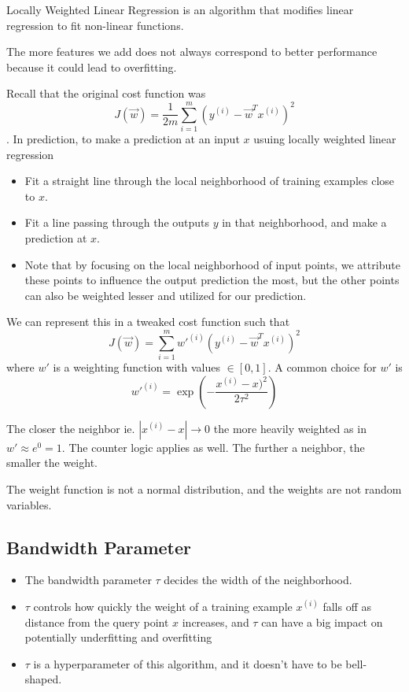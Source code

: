 \documentclass[12pt]{scrartcl}
\begin{document}
Locally Weighted Linear Regression is an algorithm that modifies linear regression to fit non-linear functions.

\begin{note}
    The more features we add does not always correspond to better performance because it could lead to overfitting.
\end{note}

Recall that the original cost function was
\[J(\vec{w}) = \frac{1}{2m}\sum_{i = 1}^m (y^{(i)} - \vec{w}^T x^{(i)})^2\]. In prediction, to make a prediction at an input $x$ usuing locally weighted linear regression
\begin{itemize}
    \item Fit a straight line through the local neighborhood of training examples close to $x$.
    \item Fit a line passing through the outputs $y$ in that neighborhood, and make a prediction at $x$.
    \item Note that by focusing on the local neighborhood of input points, we attribute these points to influence the output prediction the most, but the other points can also be weighted lesser and utilized for our prediction.
\end{itemize}
We can represent this in a tweaked cost function such that 
\[J(\vec{w}) = \sum_{i=1}^m w'^{(i)}(y^{(i)} - \vec{w}^Tx^{(i)})^2\]
where $w'$ is a weighting function with values $\in [0, 1]$. A common choice for $w'$ is 
\[w'^{(i)} = \exp(-\frac{x^{(i)} - x)^2}{2\tau^2})\]
\begin{note}
    The closer the neighbor ie. $|x^{(i)} - x| \to 0$ the more heavily weighted as in $w' \approx e^0 = 1$. The counter logic applies as well. The further a neighbor, the smaller the weight.
\end{note}
\begin{note}
    The weight function is not a normal distribution, and the weights are not random variables.
\end{note}

\subsection{Bandwidth Parameter}

\begin{itemize}
    \item The bandwidth parameter $\tau$ decides the width of the neighborhood.
    \item $\tau$ controls how quickly the weight of a training example $x^{(i)}$ falls off as distance from the query point $x$ increases, and $\tau$ can have a big impact on potentially underfitting and overfitting
    \item $\tau$ is a hyperparameter of this algorithm, and it doesn't have to be bell-shaped.
\end{itemize}
\end{document}
